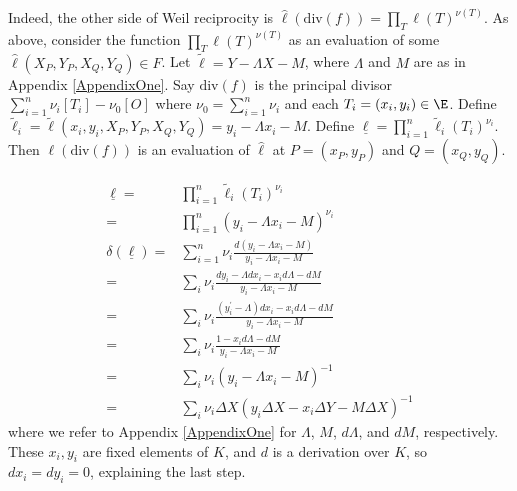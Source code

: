 \documentclass[11pt,letterpaper]{article}
\theoremstyle{definition}
\newcommand{\6}{\mathbf}
\newcommand{\7}{\mathcal}
\begin{document}
Indeed, the other side of Weil reciprocity is $\widehat{\ell}(\text{div}(f)) = \prod_T \ell(T)^{\nu(T)}$.
As above, consider the function $\prod_T \ell(T)^{\nu(T)}$ as an evaluation of some $\widehat{\ell}(X_P, Y_P, X_Q, Y_Q) \in F$. 
Let $\widetilde{\ell} = Y - \Lambda X - M$, where $\Lambda$ and $M$ are as in Appendix \ref{AppendixOne}. Say $\text{div}(f)$ is the principal divisor $\sum_{i=1}^{n} \nu_i [T_i] - \nu_0[O]$ where $\nu_0 = \sum_{i=1}^{n} \nu_i$ and each $T_i = (x_i, y_i) \in \E$. Define $\widetilde{\ell}_i = \widetilde{\ell}(x_i, y_i, X_P, Y_P, X_Q, Y_Q) = y_i - \Lambda x_i - M$. Define $\underline{\ell} = \prod_{i=1}^{n} \widetilde{\ell}_i(T_i)^{\nu_i}$. 
Then $\ell(\text{div}(f))$ is an evaluation of $\widehat{\ell}$ at $P = (x_P, y_P)$ and $Q=(x_Q, y_Q)$.  

\begin{align}
\underline{\ell} =& \prod_{i=1}^{n} \widetilde{\ell}_i(T_i)^{\nu_i} \nonumber \\
=& \prod_{i=1}^{n} (y_i - \Lambda x_i - M)^{\nu_i} \nonumber \\
\delta(\underline{\ell}) =& \sum_{i=1}^{n} \nu_i \frac{d\left(y_i - \Lambda x_i - M\right)}{y_i - \Lambda x_i - M} \nonumber \\
=& \sum_i \nu_i \frac{dy_i - \Lambda dx_i - x_i d\Lambda - dM}{y_i - \Lambda x_i - M} \nonumber \\
=& \sum_i \nu_i \frac{(y_i^\prime - \Lambda)dx_i - x_i d\Lambda - dM}{y_i - \Lambda x_i - M} \nonumber \\
=& \sum_i \nu_i \frac{1 - x_i d\Lambda - dM}{y_i - \Lambda x_i - M} \nonumber \\
=& \sum_i \nu_i (y_i - \Lambda x_i - M)^{-1} \nonumber\\
=& \sum_i \nu_i \Delta X(y_i \Delta X - x_i \Delta Y - M \Delta X)^{-1} \label{delta_ell}
\end{align} where we refer to Appendix \ref{AppendixOne} for $\Lambda$, $M$, $d\Lambda$, and $dM$, respectively.
These $x_i, y_i$ are fixed elements of $K$, and $d$ is a derivation over $K$, so $dx_i = dy_i = 0$, explaining the last step. 




\end{document}
